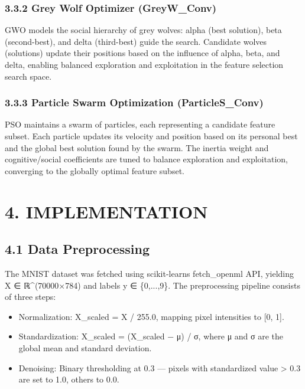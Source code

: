 \documentclass[
]{article}
\begin{document}
\hypertarget{grey-wolf-optimizer-greyw_conv}{%
\subsubsection{3.3.2 Grey Wolf Optimizer
(GreyW\_Conv)}\label{grey-wolf-optimizer-greyw_conv}}

GWO models the social hierarchy of grey wolves: alpha (best solution),
beta (second-best), and delta (third-best) guide the search. Candidate
wolves (solutions) update their positions based on the influence of
alpha, beta, and delta, enabling balanced exploration and exploitation
in the feature selection search space.

\hypertarget{particle-swarm-optimization-particles_conv}{%
\subsubsection{3.3.3 Particle Swarm Optimization
(ParticleS\_Conv)}\label{particle-swarm-optimization-particles_conv}}

PSO maintains a swarm of particles, each representing a candidate
feature subset. Each particle updates its velocity and position based on
its personal best and the global best solution found by the swarm. The
inertia weight and cognitive/social coefficients are tuned to balance
exploration and exploitation, converging to the globally optimal feature
subset.

\hypertarget{implementation}{%
\section{4. IMPLEMENTATION}\label{implementation}}

\hypertarget{data-preprocessing}{%
\subsection{4.1 Data Preprocessing}\label{data-preprocessing}}

The MNIST dataset was fetched using scikit-learn\textquotesingle s
fetch\_openml API, yielding X ∈ ℝ\^{}(70000×784) and labels y ∈
\{0,...,9\}. The preprocessing pipeline consists of three steps:

\begin{itemize}
\item
  Normalization: X\_scaled = X / 255.0, mapping pixel intensities to
  {[}0, 1{]}.
\item
  Standardization: X\_scaled = (X\_scaled − μ) / σ, where μ and σ are
  the global mean and standard deviation.
\item
  Denoising: Binary thresholding at 0.3 --- pixels with standardized
  value \textgreater{} 0.3 are set to 1.0, others to 0.0.
\end{itemize}
\end{document}
